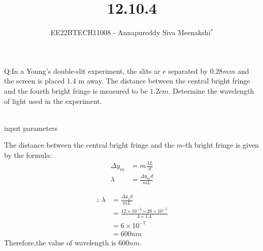 \documentclass[journal,12pt,twocolumn]{IEEEtran}
\theoremstyle{remark}
\begin{document}

\vspace{3cm}

\title{12.10.4}
\author{EE22BTECH11008 - Annapureddy Siva Meenakshi$^{*}$%
}
\maketitle
\newpage
\bigskip

\renewcommand{\thefigure}{\theenumi}
\renewcommand{\thetable}{\theenumi}
Q:In a Young's double-slit experiment, the slits ar e separated by
$0.28 mm$ and the screen is placed 1.4 m away. The distance between
the central bright fringe and the fourth bright fringe is measured
to be $1.2 cm$. Determine the wavelength of light used in the
experiment.
\\\solution\\
\begin{table}[!ht]
    \centering
        
    \caption{input parameters}
    \label{tab:12_10_4_1}
\end{table}
The distance between the central bright fringe and the $m$-th bright fringe is given by the formula:
\begin{align}
\Delta y_m &= m \frac{\lambda L}{d} \\
\lambda&=\frac {\Delta y_m d}{mL}
\end{align}

\begin{align}
  \therefore\ \lambda&=\frac {\Delta y_4 d}{mL}\\
&=\frac{12\times 10^{-3}\times28 \times 10^{-5}}{4\times1.4}\\
&=6\times 10^{-7}\\
&=600nm
\end{align}
Therefore,the value of wavelength is $600nm$.
\end{document}
